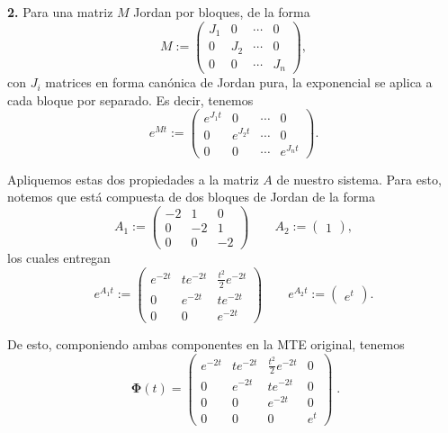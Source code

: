 \documentclass[
  11pt,
  letterpaper,
   addpoints,
   answers
  ]{exam}
\begin{document}
\begin{questions}
\begin{solution}
\medskip
\noindent\textbf{2.} Para una matriz $M$ Jordan por bloques, de la forma
\begin{equation}
M:=\begin{pmatrix}
J_1 & 0 & \cdots & 0\\
0 & J_2 & \cdots & 0\\
0 & 0 & \cdots & J_n
\end{pmatrix},
\end{equation}
con $J_i$ matrices en forma canónica de Jordan pura, la exponencial se aplica a cada bloque por separado. Es decir, tenemos
\begin{equation}
e^{M t}:=\begin{pmatrix}
e^{J_1 t} & 0 & \cdots & 0\\
0 & e^{J_2 t} & \cdots & 0\\
0 & 0 & \cdots & e^{J_n t}
\end{pmatrix}.
\end{equation}

Apliquemos estas dos propiedades a la matriz $A$ de nuestro sistema. Para esto, notemos que está compuesta de dos bloques de Jordan de la forma
\begin{equation}
A_1:=\begin{pmatrix}
-2 & 1 & 0\\
0 & -2 & 1\\
0 & 0 & -2
\end{pmatrix}
\qquad
A_2:=\begin{pmatrix}1\end{pmatrix},
\end{equation}
los cuales entregan
\begin{equation}
e^{A_1 t}:=\begin{pmatrix}
e^{-2t} & t e^{-2t} & \tfrac{t^{2}}{2} e^{-2t}\\
0 & e^{-2t} & t e^{-2t}\\
0 & 0 & e^{-2t}
\end{pmatrix}
\qquad
e^{A_2 t}:=\begin{pmatrix} e^{t}\end{pmatrix}.
\end{equation}

De esto, componiendo ambas componentes en la MTE original, tenemos
\begin{equation}
\;
\bm{\Phi}(t)=
\begin{pmatrix}
e^{-2t} & t e^{-2t} & \tfrac{t^{2}}{2} e^{-2t} & 0\\
0 & e^{-2t} & t e^{-2t} & 0\\
0 & 0 & e^{-2t} & 0\\
0 & 0 & 0 & e^{t}
\end{pmatrix}
\;.
\end{equation}


\end{solution}
\end{questions}
\end{document}
